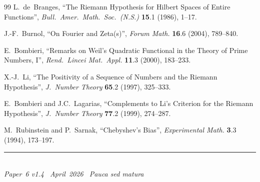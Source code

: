 \documentclass[11pt]{article}
\begin{document}
\begin{thebibliography}{99}
L.~de~Branges,
``The Riemann Hypothesis for Hilbert Spaces of Entire Functions'',
\emph{Bull.\ Amer.\ Math.\ Soc.\ (N.S.)} \textbf{15}.1 (1986),
1--17.

J.-F.~Burnol,
``On Fourier and Zeta(s)'',
\emph{Forum Math.} \textbf{16}.6 (2004), 789--840.

E.~Bombieri,
``Remarks on Weil's Quadratic Functional in the Theory of Prime
Numbers, I'',
\emph{Rend.\ Lincei Mat.\ Appl.} \textbf{11}.3 (2000), 183--233.

X.-J.~Li,
``The Positivity of a Sequence of Numbers and the Riemann
Hypothesis'',
\emph{J.\ Number Theory} \textbf{65}.2 (1997), 325--333.

E.~Bombieri and J.C.~Lagarias,
``Complements to Li's Criterion for the Riemann Hypothesis'',
\emph{J.\ Number Theory} \textbf{77}.2 (1999), 274--287.

M.~Rubinstein and P.~Sarnak,
``Chebyshev's Bias'',
\emph{Experimental Math.} \textbf{3}.3 (1994), 173--197.

\end{thebibliography}

\enlargethispage{3\baselineskip}
\vspace*{\fill}
\begin{minipage}{\linewidth}
\rule{\linewidth}{0.4pt}\smallskip\\
\small\emph{Paper~6 v1.4 \textperiodcentered\ April~2026
\textperiodcentered\ Pauca sed matura}
\end{minipage}
\end{document}
